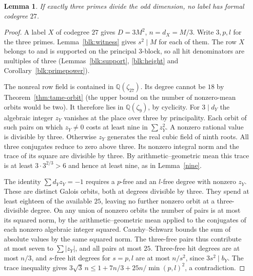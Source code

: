 \documentclass[11pt]{amsart}
\numberwithin{equation}{section}
\newtheorem{lemma}[theorem]{Lemma}
\theoremstyle{definition}
\theoremstyle{plain}
\newcommand{\QQ}{\mathbb Q}
\begin{document}
\begin{lemma}\label{odd:27}
If exactly three primes divide the odd dimension, no label has
formal codegree $27$.
\end{lemma}
\begin{proof}
A label $X$ of codegree $27$ gives $D=3M^2$, $n=d_X=M/3$.
Write $3,p,l$ for the three primes. Lemma~\ref{blk:witness}
gives $s^2\mid M$ for each of them.
The row $X$ belongs to and is supported on the principal $3$-block,
so all hit denominators are multiples of three
(Lemmas~\ref{blk:support}, \ref{blk:height} and
Corollary~\ref{blk:primepower}).

The nonreal row field is contained in $\QQ(\zeta_{27})$. Its
degree cannot be $18$ by Theorem~\ref{thm:tame-orbit} (the upper
bound on the number of nonzero-mean orbits would be two).
It therefore lies in $\QQ(\zeta_9)$, by cyclicity.
For $3\mid d_Y$ the algebraic integer $z_Y$ vanishes at the place over three
by principality. Each orbit of such pairs on which $z_Y\ne0$
costs at least nine in $\sum z_Y^2$. A nonzero rational value
is divisible by three. Otherwise $z_Y$ generates the real cubic field of ninth roots.
All three conjugates reduce to zero above three. Its nonzero integral
norm and the trace of its square are divisible by three. By
arithmetic--geometric mean this trace is at least $3\cdot3^{2/3}>6$
and hence at least nine, as in Lemma~\ref{nine}.

The identity $\sum d_Yz_Y=-1$ requires a $p$-free and an $l$-free
degree with nonzero $z_Y$. These are distinct Galois orbits,
both at degrees divisible by three. They spend at least eighteen
of the available $25$, leaving no further nonzero orbit at a
three-divisible degree. On any union of nonzero orbits the number
of pairs is at most its squared norm, by the arithmetic--geometric
mean applied to the conjugates of each nonzero algebraic integer
squared. Cauchy--Schwarz bounds the sum of absolute values by the
same squared norm. The three-free pairs thus contribute at most
seven to $\sum |z_Y|$, and all pairs at most $25$. Three-free hit
degrees are at most $n/3$, and $s$-free hit degrees for $s=p,l$
are at most $n/s^2$, since $3s^2\mid b_Y$. The trace inequality gives
$3\sqrt3\,n\le 1+7n/3+25n/\min(p,l)^2$, a contradiction.
\end{proof}
\end{document}
